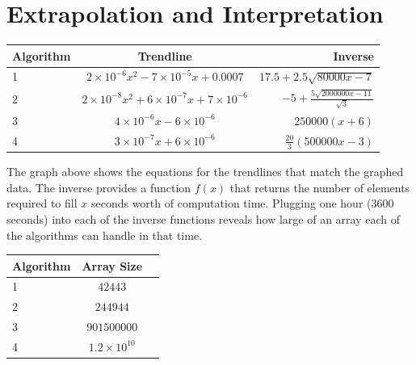 \documentclass[letWterpaper,10pt,titlepage]{article}
\begin{document}
\section{Extrapolation and Interpretation}
\begin{center}
    \begin{tabular}{|l|c|r|}
        \hline
        Algorithm & Trendline & Inverse \\ \hline
        1 & $2\times10^{-6}x^2-7\times10^{-5}x+0.0007$ & $17.5+2.5\sqrt{80000x-7}$\\ \hline
        2 & $2\times10^{-8}x^2+6\times10^{-7}x+7\times10^{-6}$ & $-5+\frac{5\sqrt{2000000x-11}}{\sqrt{3}}$\\ \hline
        3 & $4\times10^{-6}x-6\times10^{-6}$ & $250000(x+6)$ \\ \hline
        4 & $3\times10^{-7}x+6\times10^{-6}$ & $\frac{20}{3}(500000x-3)$ \\ \hline
    \end{tabular}
\end{center}

The graph above shows the equations for the trendlines that match the graphed data. The inverse provides a function $f(x)$ that returns the number of elements required to fill $x$ seconds worth of computation time. Plugging one hour (3600 seconds) into each of the inverse functions reveals how large of an array each of the algorithms can handle in that time.

\begin{center}
    \begin{tabular}{|l|c|r|}
        \hline
        Algorithm & Array Size \\ \hline
        1 & $42443$ \\ \hline
        2 & $244944$ \\ \hline
        3 & $901500000$ \\ \hline
        4 & $1.2\times10^{10}$ \\ \hline
    \end{tabular}
\end{center}
\end{document}
